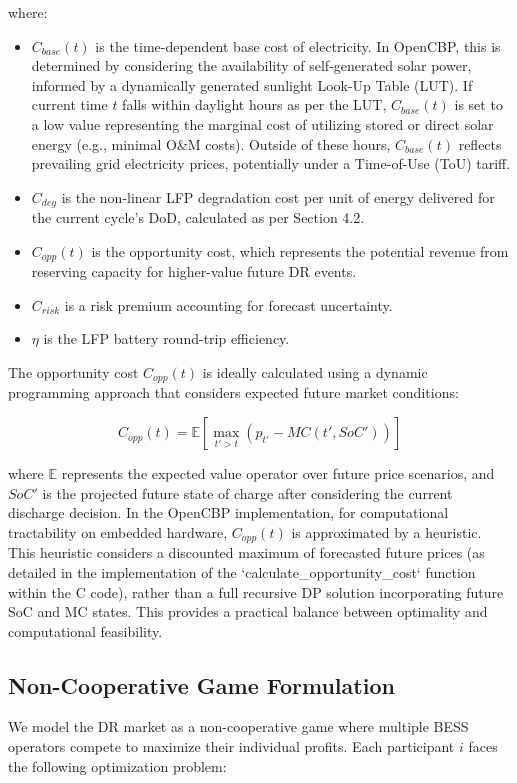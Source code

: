 \documentclass[11pt,a4paper]{article}
\begin{document}
where:
\begin{itemize}
    \item $C_{base}(t)$ is the time-dependent base cost of electricity. In OpenCBP, this is determined by considering the availability of self-generated solar power, informed by a dynamically generated sunlight Look-Up Table (LUT). If current time $t$ falls within daylight hours as per the LUT, $C_{base}(t)$ is set to a low value representing the marginal cost of utilizing stored or direct solar energy (e.g., minimal O\&M costs). Outside of these hours, $C_{base}(t)$ reflects prevailing grid electricity prices, potentially under a Time-of-Use (ToU) tariff.
    \item $C_{deg}$ is the non-linear LFP degradation cost per unit of energy delivered for the current cycle's DoD, calculated as per Section 4.2.
    \item $C_{opp}(t)$ is the opportunity cost, which represents the potential revenue from reserving capacity for higher-value future DR events.
    \item $C_{risk}$ is a risk premium accounting for forecast uncertainty.
    \item $\eta$ is the LFP battery round-trip efficiency.
\end{itemize}

The opportunity cost $C_{opp}(t)$ is ideally calculated using a dynamic programming approach that considers expected future market conditions:

\begin{equation}
C_{opp}(t) = \mathbb{E}\left[ \max_{t' > t} (p_{t'} - MC(t', SoC')) \right]
\end{equation}

where $\mathbb{E}$ represents the expected value operator over future price scenarios, and $SoC'$ is the projected future state of charge after considering the current discharge decision. In the OpenCBP implementation, for computational tractability on embedded hardware, $C_{opp}(t)$ is approximated by a heuristic. This heuristic considers a discounted maximum of forecasted future prices (as detailed in the implementation of the `calculate_opportunity_cost` function within the C code), rather than a full recursive DP solution incorporating future SoC and MC states. This provides a practical balance between optimality and computational feasibility.

\subsection{Non-Cooperative Game Formulation}
We model the DR market as a non-cooperative game where multiple BESS operators compete to maximize their individual profits. Each participant $i$ faces the following optimization problem:
\end{document}
